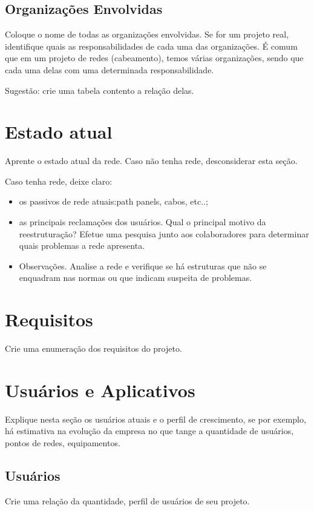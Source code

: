 \documentclass[	DIV=calc,%
paper=a4,%
fontsize=12pt,%
onecolumn]{scrartcl}	 					%
\begin{document}
	\subsection{Organizações Envolvidas}
	Coloque o nome de todas as organizações envolvidas. Se for um projeto real, identifique quais as responsabilidades de cada uma das organizações. É comum que em um projeto de redes (cabeamento), temos várias organizações, sendo que cada uma delas com uma determinada responsabilidade.
	
	Sugestão: crie uma tabela contento a relação delas.
	
	
	
	\section{Estado atual}
	Aprente o estado atual da rede. Caso não tenha rede, desconsiderar esta seção.
	
	Caso tenha rede, deixe claro:
	\begin{itemize}
		\item os passivos de rede atuais:path panels, cabos, etc..;
		\item as principais reclamações dos usuários. Qual o principal motivo da reestruturação? Efetue uma pesquisa junto aos colaboradores para determinar quais problemas a rede apresenta.
		\item Observações. Analise a rede e verifique se há estruturas que não se enquadram nas normas ou que indicam suspeita de problemas.
	\end{itemize}
	
	\section{Requisitos}
	Crie uma enumeração dos requisitos do projeto.
	
	\section{Usuários e Aplicativos}
	Explique nesta seção os usuários atuais e o perfil de crescimento, se por exemplo, há estimativa na evolução da empresa no que tange a quantidade de usuários, pontos de redes, equipamentos.
	
	
	\subsection{Usuários}
	Crie uma relação da quantidade, perfil de usuários de seu projeto.
	
\end{document}
